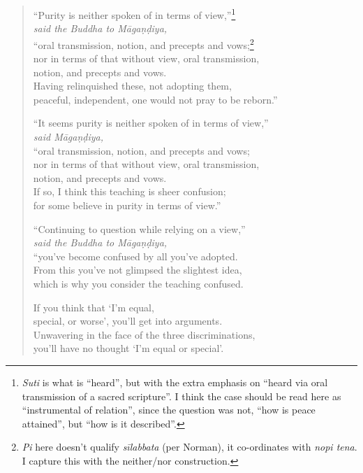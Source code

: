 \documentclass[12pt,openany]{book}%
\newcommand*{\scspeaker}[1]{\hspace{2em}\textit{#1}}
\begin{document}
\begin{verse}
“Purity is neither spoken of in terms of view,”\footnote{\textit{Suti} is what is “heard”, but with the extra emphasis on “heard via oral transmission of a sacred scripture”. I think the case should be read here as “instrumental of relation”, since the question was not, “how is peace attained”, but “how is it described”. } \\
\scspeaker{said the Buddha to \textsanskrit{Māgaṇḍiya}, }\\
“oral transmission, notion, and precepts and vows;\footnote{\textit{Pi} here doesn’t qualify \textit{\textsanskrit{sīlabbata}} (per Norman), it co-ordinates with \textit{nopi tena}. I capture this with the neither/nor construction. } \\
nor in terms of that without view, oral transmission, \\
notion, and precepts and vows. \\
Having relinquished these, not adopting them, \\
peaceful, independent, one would not pray to be reborn.” 

“It seems purity is neither spoken of in terms of view,” \\
\scspeaker{said \textsanskrit{Māgaṇḍiya}, }\\
“oral transmission, notion, and precepts and vows; \\
nor in terms of that without view, oral transmission, \\
notion, and precepts and vows. \\
If so, I think this teaching is sheer confusion; \\
for some believe in purity in terms of view.” 

“Continuing to question while relying on a view,” \\
\scspeaker{said the Buddha to \textsanskrit{Māgaṇḍiya}, }\\
“you’ve become confused by all you’ve adopted. \\
From this you’ve not glimpsed the slightest idea, \\
which is why you consider the teaching confused. 

If you think that ‘I’m equal, \\
special, or worse’, you’ll get into arguments. \\
Unwavering in the face of the three discriminations, \\
you’ll have no thought ‘I’m equal or special’. 


\end{verse}
\end{document}
